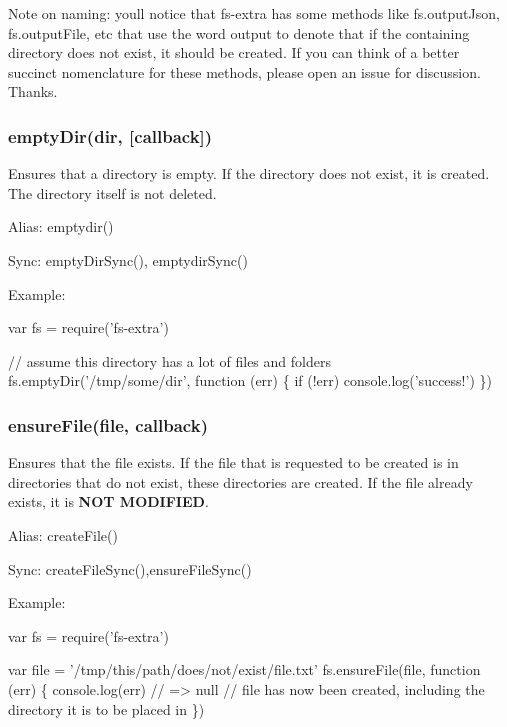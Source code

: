 Note on naming\+: you\textquotesingle{}ll notice that fs-\/extra has some methods like {\ttfamily fs.\+output\+Json}, {\ttfamily fs.\+output\+File}, etc that use the word {\ttfamily output} to denote that if the containing directory does not exist, it should be created. If you can think of a better succinct nomenclature for these methods, please open an issue for discussion. Thanks.

\subsubsection*{empty\+Dir(dir, \mbox{[}callback\mbox{]})}

Ensures that a directory is empty. If the directory does not exist, it is created. The directory itself is not deleted.

Alias\+: {\ttfamily emptydir()}

Sync\+: {\ttfamily empty\+Dir\+Sync()}, {\ttfamily emptydir\+Sync()}

Example\+:


\begin{DoxyCode}
var fs = require(\textcolor{stringliteral}{'fs-extra'})

\textcolor{comment}{// assume this directory has a lot of files and folders}
fs.emptyDir('/tmp/some/dir', function (err) \{
  \textcolor{keywordflow}{if} (!err) console.log(\textcolor{stringliteral}{'success!'})
\})
\end{DoxyCode}


\subsubsection*{ensure\+File(file, callback)}

Ensures that the file exists. If the file that is requested to be created is in directories that do not exist, these directories are created. If the file already exists, it is {\bfseries N\+O\+T M\+O\+D\+I\+F\+I\+E\+D}.

Alias\+: {\ttfamily create\+File()}

Sync\+: {\ttfamily create\+File\+Sync()},{\ttfamily ensure\+File\+Sync()}

Example\+:


\begin{DoxyCode}
var fs = require(\textcolor{stringliteral}{'fs-extra'})

var file = '/tmp/this/path/does/not/exist/file.txt'
fs.ensureFile(file, function (err) \{
  console.log(err) \textcolor{comment}{// => null}
  \textcolor{comment}{// file has now been created, including the directory it is to be placed in}
\})
\end{DoxyCode}


